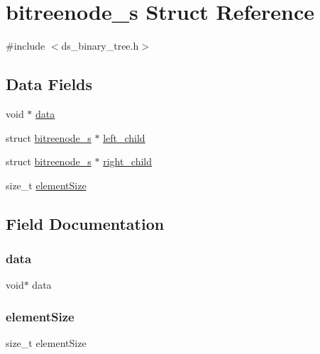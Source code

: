 \hypertarget{structbitreenode__s}{}\section{bitreenode\+\_\+s Struct Reference}
\label{structbitreenode__s}


{\ttfamily \#include $<$ds\+\_\+binary\+\_\+tree.\+h$>$}

\subsection*{Data Fields}
\begin{DoxyCompactItemize}
\item 
void $\ast$ \hyperlink{structbitreenode__s_a735984d41155bc1032e09bece8f8d66d}{data}
\item 
struct \hyperlink{structbitreenode__s}{bitreenode\+\_\+s} $\ast$ \hyperlink{structbitreenode__s_aca9af0f3ba369b6aff616640a0b842aa}{left\+\_\+child}
\item 
struct \hyperlink{structbitreenode__s}{bitreenode\+\_\+s} $\ast$ \hyperlink{structbitreenode__s_a27d28175093bd9993fc8ad15496114c0}{right\+\_\+child}
\item 
size\+\_\+t \hyperlink{structbitreenode__s_af884332e6713af9425451adde09e0024}{element\+Size}
\end{DoxyCompactItemize}


\subsection{Field Documentation}
\mbox{\label{structbitreenode__s_a735984d41155bc1032e09bece8f8d66d}} 
\subsubsection{\texorpdfstring{data}{data}}
{\footnotesize\ttfamily void$\ast$ data}

\mbox{\label{structbitreenode__s_af884332e6713af9425451adde09e0024}} 
\subsubsection{\texorpdfstring{element\+Size}{elementSize}}
{\footnotesize\ttfamily size\+\_\+t element\+Size}

